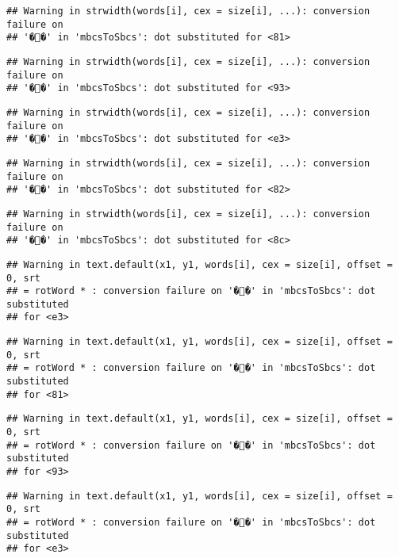 \documentclass[]{article}
\begin{document}
\begin{verbatim}
## Warning in strwidth(words[i], cex = size[i], ...): conversion failure on
## '��' in 'mbcsToSbcs': dot substituted for <81>
\end{verbatim}

\begin{verbatim}
## Warning in strwidth(words[i], cex = size[i], ...): conversion failure on
## '��' in 'mbcsToSbcs': dot substituted for <93>
\end{verbatim}

\begin{verbatim}
## Warning in strwidth(words[i], cex = size[i], ...): conversion failure on
## '��' in 'mbcsToSbcs': dot substituted for <e3>
\end{verbatim}

\begin{verbatim}
## Warning in strwidth(words[i], cex = size[i], ...): conversion failure on
## '��' in 'mbcsToSbcs': dot substituted for <82>
\end{verbatim}

\begin{verbatim}
## Warning in strwidth(words[i], cex = size[i], ...): conversion failure on
## '��' in 'mbcsToSbcs': dot substituted for <8c>
\end{verbatim}

\begin{verbatim}
## Warning in text.default(x1, y1, words[i], cex = size[i], offset = 0, srt
## = rotWord * : conversion failure on '��' in 'mbcsToSbcs': dot substituted
## for <e3>
\end{verbatim}

\begin{verbatim}
## Warning in text.default(x1, y1, words[i], cex = size[i], offset = 0, srt
## = rotWord * : conversion failure on '��' in 'mbcsToSbcs': dot substituted
## for <81>
\end{verbatim}

\begin{verbatim}
## Warning in text.default(x1, y1, words[i], cex = size[i], offset = 0, srt
## = rotWord * : conversion failure on '��' in 'mbcsToSbcs': dot substituted
## for <93>
\end{verbatim}

\begin{verbatim}
## Warning in text.default(x1, y1, words[i], cex = size[i], offset = 0, srt
## = rotWord * : conversion failure on '��' in 'mbcsToSbcs': dot substituted
## for <e3>
\end{verbatim}
\end{document}
